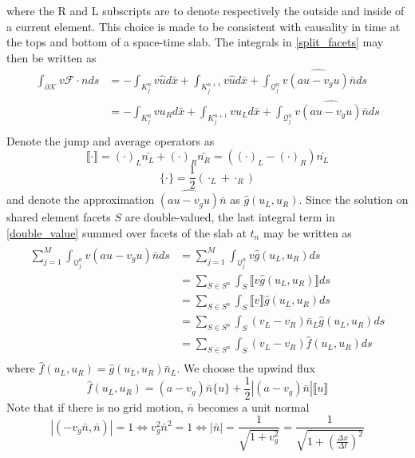 \documentclass[11pt, oneside]{article}   	%
\begin{document}
where the R and L subscripts are to denote respectively the outside and inside of a current element.
This choice is made to be consistent with causality in time at the tops and bottom of a space-time slab.
The integrals in \eqref{split_facets} may then be written as
\begin{equation}\label{double_value}
\begin{split}
\int_{\partial\mathcal{K}} v \mathcal{F}\cdot n ds
&= - \int_{K_j^n} v \hat{u} d\bar{x} + \int_{K_j^{n+1}} v \hat{u} d\bar{x} + \int_{\mathcal{Q}_j^n} v \widehat{(a u - v_g u)} \bar{n} ds\\
&= - \int_{K_j^n} v u_R d\bar{x} + \int_{K_j^{n+1}} v u_L d\bar{x} + \int_{\mathcal{Q}_j^n} v \widehat{(a u - v_g u)} \bar{n} ds\\
\end{split}
\end{equation}
Denote the jump and average operators as
\[ \llbracket \cdot \rrbracket = (\cdot)_L\bar{n_L} + (\cdot)_R\bar{n_R} = ((\cdot)_L - (\cdot)_R)\bar{n_L} \]
\[ \{ \cdot \} = \frac{1}{2}(\cdot_L + \cdot_R) \]
and denote the approximation $\widehat{(au-v_{g}u)}\bar{n}$ as $\hat{g}(u_L,u_R)$.
Since the solution on shared element facets $S$ are double-valued, the last integral term in \eqref{double_value} summed over facets of the slab at $t_n$ may be written as
\begin{equation}\label{facet_integrals}
\begin{split}
\sum_{j=1}^{M} \int_{\mathcal{Q}_j^n} v \widehat{(a u - v_g u)} \bar{n} ds
&= \sum_{j=1}^{M} \int_{\mathcal{Q}_j^n} v \hat{g}(u_L,u_R) ds \\
&= \sum_{S \in S^n} \int_{S} \llbracket v \hat{g}(u_L,u_R) \rrbracket ds \\
&= \sum_{S \in S^n} \int_{S} \llbracket v \rrbracket \hat{g}(u_L,u_R) ds \\
&= \sum_{S \in S^n} \int_{S} (v_L - v_R) \bar{n}_L \hat{g}(u_L,u_R) ds \\
&= \sum_{S \in S^n} \int_{S} (v_L - v_R) \hat{f}(u_L,u_R) ds \\
\end{split}
\end{equation}
where $\hat{f}(u_L,u_R) = \hat{g}(u_L,u_R)\bar{n}_L$.
We choose the upwind flux
\[ \hat{f}(u_L,u_R) = (a-v_g)\bar{n}\{ u \} + \frac{1}{2}|(a-v_g)\bar{n}| \llbracket u \rrbracket \]
Note that if there is no grid motion, $\bar{n}$ becomes a unit normal
\[|(-v_g \bar{n}, \bar{n})| = 1 \iff v_g^2\bar{n}^2 = 1 \iff |\bar{n}| = \frac{1}{\sqrt{1+v_g^2}} = \frac{1}{\sqrt{1+(\frac{\Delta x}{\Delta t})^2}} \]
\end{document}
